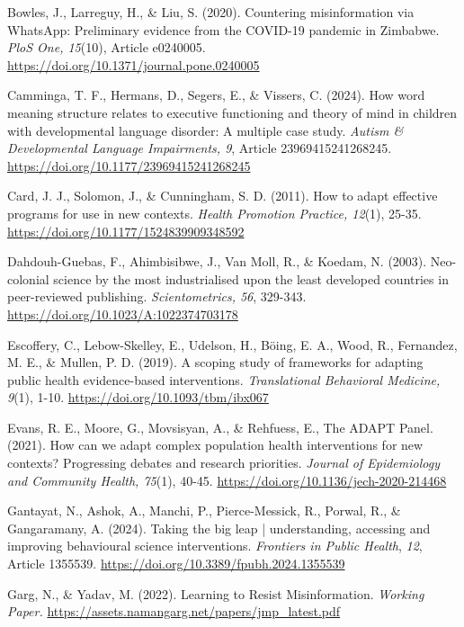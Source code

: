 \documentclass[authordate, reflection, issue]{jote-new-article}
\begin{document}
	Bowles, J., Larreguy, H., \& Liu, S. (2020). Countering misinformation via WhatsApp: Preliminary evidence from the COVID-19 pandemic in Zimbabwe. \emph{PloS One, 15}(10), Article e0240005. \url{https://doi.org/10.1371/journal.pone.0240005}



	Camminga, T. F., Hermans, D., Segers, E., \& Vissers, C. (2024). How word meaning structure relates to executive functioning and theory of mind in children with developmental language disorder: A multiple case study. \emph{Autism \& Developmental Language Impairments, 9}, Article 23969415241268245. \url{https://doi.org/10.1177/23969415241268245}



	Card, J. J., Solomon, J., \& Cunningham, S. D. (2011). How to adapt effective programs for use in new contexts. \emph{Health Promotion Practice, 12}(1), 25-35. \url{https://doi.org/10.1177/1524839909348592}



	Dahdouh-Guebas, F., Ahimbisibwe, J., Van Moll, R., \& Koedam, N. (2003). Neo-colonial science by the most industrialised upon the least developed countries in peer-reviewed publishing. \emph{Scientometrics, 56}, 329-343. \url{https://doi.org/10.1023/A:1022374703178}



	Escoffery, C., Lebow-Skelley, E., Udelson, H., Böing, E. A., Wood, R., Fernandez, M. E., \& Mullen, P. D. (2019). A scoping study of frameworks for adapting public health evidence-based interventions. \emph{Translational Behavioral Medicine, 9}(1), 1-10. \url{https://doi.org/10.1093/tbm/ibx067}



	Evans, R. E., Moore, G., Movsisyan, A., \& Rehfuess, E., The ADAPT Panel. (2021). How can we adapt complex population health interventions for new contexts? Progressing debates and research priorities. \emph{Journal of Epidemiology and Community Health, 75}(1), 40-45. \url{https://doi.org/10.1136/jech-2020-214468}



	Gantayat, N., Ashok, A., Manchi, P., Pierce-Messick, R., Porwal, R., \& Gangaramany, A. (2024). Taking the big leap | understanding, accessing and improving behavioural science interventions. \emph{Frontiers in Public Health}, \emph{12}, Article 1355539. \url{https://doi.org/10.3389/fpubh.2024.1355539}



	Garg, N., \& Yadav, M. (2022). Learning to Resist Misinformation. \emph{Working Paper.} \url{https://assets.namangarg.net/papers/jmp\_latest.pdf}
\end{document}
